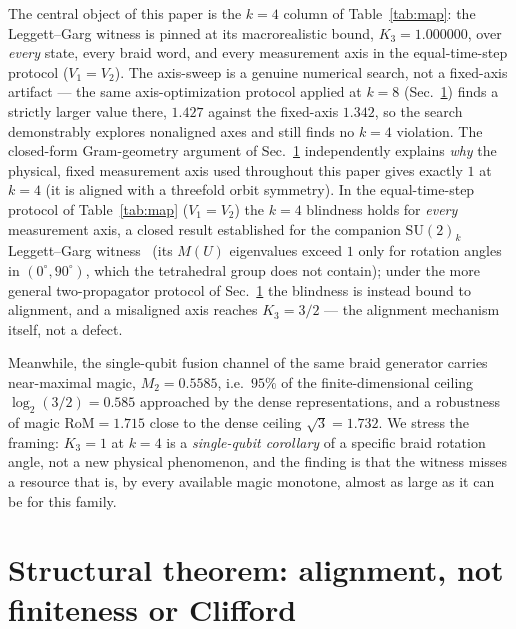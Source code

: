 \documentclass[aps,pra,twocolumn,superscriptaddress,longbibliography,floatfix,nofootinbib]{revtex4-2}
\begin{document}
The central object of this paper is the $k=4$ column of
Table~\ref{tab:map}: the Leggett--Garg witness is pinned at its
macrorealistic bound, $K_3=1.000000$, over \emph{every} state, every
braid word, and every measurement axis in the equal-time-step
protocol ($V_1{=}V_2$). The axis-sweep is a genuine
numerical search, not a fixed-axis artifact --- the same
axis-optimization protocol applied at $k=8$ (Sec.~\ref{sec:theorem})
finds a strictly larger value there, $1.427$ against the fixed-axis
$1.342$, so the search demonstrably explores nonaligned axes and
still finds no $k=4$ violation. The closed-form Gram-geometry argument
of Sec.~\ref{sec:theorem} independently explains \emph{why} the
physical, fixed measurement axis used throughout this paper gives
exactly $1$ at $k=4$ (it is aligned with a threefold orbit symmetry).
In the equal-time-step protocol of Table~\ref{tab:map} ($V_1{=}V_2$)
the $k=4$ blindness holds for \emph{every} measurement axis, a closed
result established for the companion $\mathrm{SU}(2)_k$ Leggett--Garg
witness~\cite{Sayim2026SU2k} (its $M(U)$ eigenvalues exceed $1$ only
for rotation angles in $(0^\circ,90^\circ)$, which the tetrahedral
group does not contain); under the more general two-propagator
protocol of Sec.~\ref{sec:theorem} the blindness is instead bound to
alignment, and a misaligned axis reaches $K_3=3/2$ --- the alignment
mechanism itself, not a defect.

Meanwhile, the single-qubit fusion channel of the
same braid generator carries near-maximal magic,
$M_2=0.5585$, i.e.\ $95\%$ of the finite-dimensional ceiling
$\log_2(3/2)=0.585$ approached by the dense representations, and a
robustness of magic $\mathrm{RoM}=1.715$ close to the dense ceiling
$\sqrt3=1.732$. We stress the framing: $K_3=1$ at $k=4$ is a
\emph{single-qubit corollary} of a specific braid rotation angle, not
a new physical phenomenon, and the finding is that the witness misses
a resource that is, by every available magic monotone, almost as
large as it can be for this family.

\section{Structural theorem: alignment, not finiteness or Clifford}
\label{sec:theorem}
\end{document}
